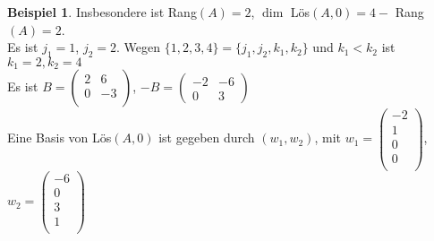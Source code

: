\documentclass[10pt,a4paper,numbers=endperiod]{scrartcl}
\theoremstyle{definition}
\newtheorem{bsp}[satz]{Beispiel}
\begin{document}
\begin{bsp}
	Insbesondere ist Rang$(A)=2$, $\dim$ Lös$(A,0)= 4 -$ Rang$(A)=2$.\\
	Es ist $j_1=1$, $j_2=2$. Wegen $\{1,2,3,4\}=\{j_1,j_2,k_1,k_2\}$ und $k_1<k_2$ ist $k_1=2,k_2=4$\\
	Es ist $B = \begin{pmatrix}
	2&6\\0&-3\\
	\end{pmatrix}$, $-B = \begin{pmatrix}
	-2&-6\\0&3
	\end{pmatrix}$\\
	Eine Basis von Lös$(A,0)$ ist gegeben durch $(w_1,w_2)$, mit $w_1=\begin{pmatrix}
		-2\\1\\
		0\\
		0\\
	\end{pmatrix}$, $w_2 = \begin{pmatrix}
	-6\\
	0\\
	3\\
	1\\
	\end{pmatrix}$
\end{bsp}
\end{document}
